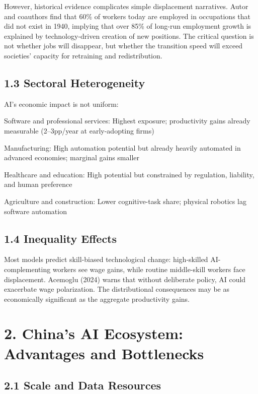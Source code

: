 \documentclass[11pt,a4paper]{article}
\begin{document}
However, historical evidence complicates simple displacement narratives. Autor and coauthors find that 60\% of workers today are employed in occupations that did not exist in 1940, implying that over 85\% of long-run employment growth is explained by technology-driven creation of new positions. The critical question is not whether jobs will disappear, but whether the transition speed will exceed societies' capacity for retraining and redistribution.

\subsection{1.3 Sectoral Heterogeneity}

AI's economic impact is not uniform:
\item Software and professional services: Highest exposure; productivity gains already measurable (2--3pp/year at early-adopting firms)
\item Manufacturing: High automation potential but already heavily automated in advanced economies; marginal gains smaller
\item Healthcare and education: High potential but constrained by regulation, liability, and human preference
\item Agriculture and construction: Lower cognitive-task share; physical robotics lag software automation

\subsection{1.4 Inequality Effects}

Most models predict skill-biased technological change: high-skilled AI-complementing workers see wage gains, while routine middle-skill workers face displacement. Acemoglu (2024) warns that without deliberate policy, AI could exacerbate wage polarization. The distributional consequences may be as economically significant as the aggregate productivity gains.


\section{2. China's AI Ecosystem: Advantages and Bottlenecks}

\subsection{2.1 Scale and Data Resources}
\end{document}
